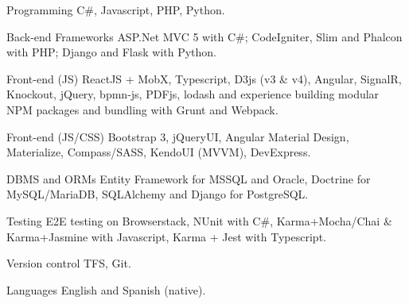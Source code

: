 


\begin{cvskills}


\cvskill
{Programming} %
{C\#, Javascript, PHP, Python.} %


\cvskill
{Back-end Frameworks} %
{ASP.Net MVC 5 with C\#; CodeIgniter, Slim and Phalcon with PHP; Django and Flask with Python.} %


\cvskill
{Front-end (JS)} %
{\newline ReactJS + MobX, Typescript, D3js (v3 \& v4), Angular, SignalR, Knockout, jQuery, bpmn-js, PDFjs, lodash and experience building modular NPM packages and bundling with Grunt and Webpack.} %
	

\cvskill
{Front-end (JS/CSS)} %
{Bootstrap 3, jQueryUI, Angular Material Design, Materialize, Compass/SASS, KendoUI (MVVM), DevExpress.} %


\cvskill
{DBMS and ORMs} %
{\newline Entity Framework for MSSQL and Oracle, Doctrine for MySQL/MariaDB, SQLAlchemy and Django for PostgreSQL.} %



\cvskill
{Testing} %
{\newline E2E testing on Browserstack, NUnit with C\#, Karma+Mocha/Chai \& Karma+Jasmine with Javascript, Karma + Jest with Typescript.} %



\cvskill
{Version control} %
{TFS, Git.} %



\cvskill
{Languages} %
{English and Spanish (native).} %


\end{cvskills}
